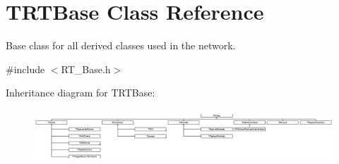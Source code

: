 \hypertarget{class_t_r_t_base}{\section{T\+R\+T\+Base Class Reference}
\label{class_t_r_t_base}
}


Base class for all derived classes used in the network.  




{\ttfamily \#include $<$R\+T\+\_\+\+Base.\+h$>$}

Inheritance diagram for T\+R\+T\+Base\+:\begin{figure}[H]
\begin{center}
\leavevmode
\includegraphics[height=1.988838cm]{class_t_r_t_base}
\end{center}
\end{figure}
